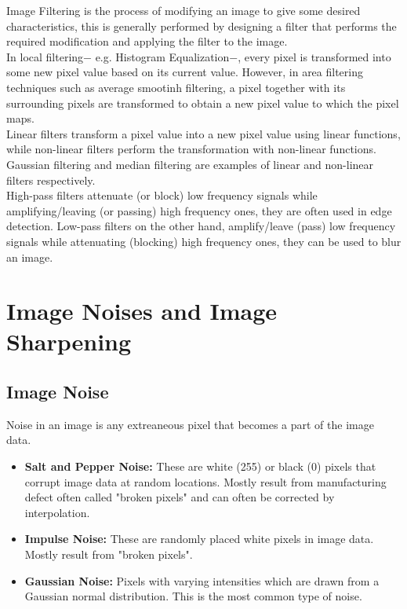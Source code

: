 \documentclass[a4paper]{article}
\begin{document}
Image Filtering is the process of modifying an image to give some desired characteristics, 
this is generally performed by designing a filter that performs the required modification and applying the filter to the image.  \\

In local filtering$-$ e.g. Histogram Equalization$-$, every pixel is transformed into some new pixel value based on its current value. 
However, in area filtering techniques such as average smootinh filtering, a pixel together with its surrounding pixels are transformed to obtain a new pixel value to which the pixel maps. \\

Linear filters transform a pixel value into a new pixel value using linear functions, 
while non-linear filters perform the transformation with non-linear functions. 
Gaussian filtering and median filtering are examples of linear and non-linear filters respectively.  \\

High-pass filters attenuate (or block) low frequency signals while amplifying/leaving (or passing) high frequency ones, they are often used in edge detection. 
Low-pass filters on the other hand, amplify/leave (pass) low frequency signals while attenuating (blocking) high frequency ones, they can be used to blur an image. \\


\section{Image Noises and Image Sharpening}

\subsection{Image Noise}
Noise in an image is any extreaneous pixel that becomes a part of the image data. 
\begin{itemize}
        \item \textbf{Salt and Pepper Noise:} These are white (255) or black (0) pixels that corrupt image data at random locations. 
        Mostly result from manufacturing defect often called "broken pixels" and can often be corrected by interpolation.  
        \item \textbf{Impulse Noise:} These are randomly placed white pixels in image data. Mostly result from "broken pixels".   
        \item \textbf{Gaussian Noise:} Pixels with varying intensities which are drawn from a Gaussian normal distribution. 
        This is the most common type of noise.  
\end{itemize}
\end{document}
